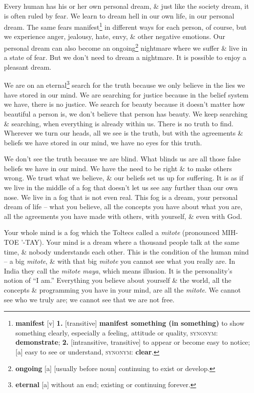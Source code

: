 \documentclass[oneside]{book}
\numberwithin{equation}{section}
\begin{document}
Every human has his or her own personal dream, \& just like the society dream, it is often ruled by fear. We learn to dream hell in our own life, in our personal dream. The same fears manifest\footnote{\textbf{manifest} [v] \textbf{1.} [transitive] \textbf{manifest something (in something)} to show something clearly, especially a feeling, attitude or quality, \textsc{synonym}: \textbf{demonstrate}; \textbf{2.} [intransitive, transitive] to appear or become easy to notice; [a] easy to see or understand, \textsc{synonym}: \textbf{clear}.} in different ways for each person, of course, but we experience anger, jealousy, hate, envy, \& other negative emotions. Our personal dream can also become an ongoing\footnote{\textbf{ongoing} [a] [usually before noun] continuing to exist or develop.} nightmare where we suffer \& live in a state of fear. But we don't need to dream a nightmare. It is possible to enjoy a pleasant dream.

 We are on an eternal\footnote{\textbf{eternal} [a] without an end; existing or continuing forever.} search for the truth because we only believe in the lies we have stored in our mind. We are searching for justice because in the belief system we have, there is no justice. We search for beauty because it doesn't matter how beautiful a person is, we don't believe that person has beauty. We keep searching \& searching, when everything is already within us. There is no truth to find. Wherever we turn our heads, all we see is the truth, but with the agreements \& beliefs we have stored in our mind, we have no eyes for this truth.

We don't see the truth because we are blind. What blinds us are all those false beliefs we have in our mind. We have the need to be right \& to make others wrong. We trust what we believe, \& our beliefs set us up for suffering. It is as if we live in the middle of a fog that doesn't let us see any further than our own nose. We live in a fog that is not even real. This fog is a dream, your personal dream of life -- what you believe, all the concepts you have about what you are, all the agreements you have made with others, with yourself, \& even with God.

Your whole mind is a fog which the Toltecs called a \textit{mitote} (pronounced MIH-TOE '-TAY). Your mind is a dream where a thousand people talk at the same time, \& nobody understands each other. This is the condition of the human mind -- a big \textit{mitote}, \& with that big \textit{mitote} you cannot see what you really are. In India they call the \textit{mitote maya}, which means illusion. It is the personality's notion of ``I am.'' Everything you believe about yourself \& the world, all the concepts \& programming you have in your mind, are all the \textit{mitote}. We cannot see who we truly are; we cannot see that we are not free.
\end{document}

